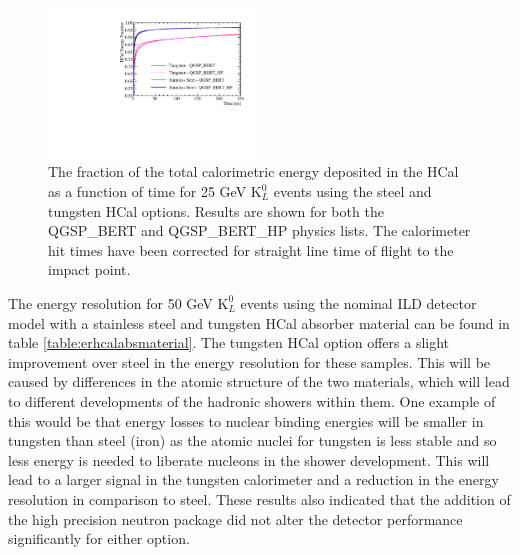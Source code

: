 \begin{figure}[h!]
\centering
\includegraphics[width=0.5\textwidth]{OptimisationStudies/Plots/Description/HCalAbsorberMaterialTimings.pdf}
\caption[The fraction of the total calorimetric energy deposited in the HCal as a function of time for 25 GeV $\text{K}^{0}_{L}$ events using the steel and tungsten HCal options.  Results are shown for both the QGSP\_BERT and QGSP\_BERT\_HP physics lists.  The calorimeter hit times have been corrected for straight line time of flight to the impact point.]{The fraction of the total calorimetric energy deposited in the HCal as a function of time for 25 GeV $\text{K}^{0}_{L}$ events using the steel and tungsten HCal options.  Results are shown for both the QGSP\_BERT and QGSP\_BERT\_HP physics lists.  The calorimeter hit times have been corrected for straight line time of flight to the impact point.}
\label{fig:hcalabsmaterialtiming}
\end{figure} 

The energy resolution for 50 GeV $\text{K}^{0}_{L}$ events using the nominal ILD detector model with a stainless steel and tungsten HCal absorber material can be found in table \ref{table:erhcalabsmaterial}.  The tungsten HCal option offers a slight improvement over steel in the energy resolution for these samples.  This will be caused by differences in the atomic structure of the two materials, which will lead to different developments of the hadronic showers within them.  One example of this would be that energy losses to nuclear binding energies will be smaller in tungsten than steel (iron) as the atomic nuclei for tungsten is less stable and so less energy is needed to liberate nucleons in the shower development.  This will lead to a larger signal in the tungsten calorimeter and a reduction in the energy resolution in comparison to steel.  These results also indicated that the addition of the high precision neutron package did not alter the detector performance significantly for either option.  

